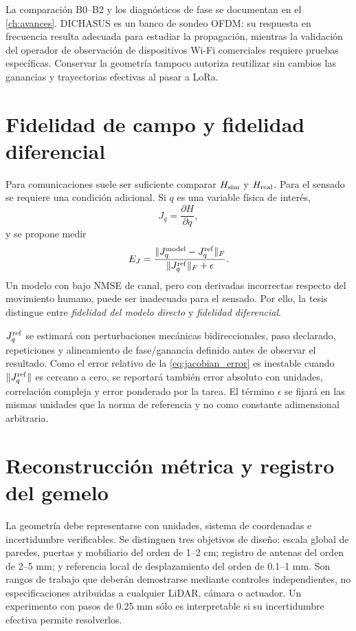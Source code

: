 La comparación B0--B2 y los diagnósticos de fase se documentan en el \cref{ch:avances}. DICHASUS es un banco de sondeo OFDM: su respuesta en frecuencia resulta adecuada para estudiar la propagación, mientras la validación del operador de observación de dispositivos Wi-Fi comerciales requiere pruebas específicas. Conservar la geometría tampoco autoriza reutilizar sin cambios las ganancias y trayectorias efectivas al pasar a LoRa.

\section{Fidelidad de campo y fidelidad diferencial}

Para comunicaciones suele ser suficiente comparar $H_{\rm sim}$ y $H_{\rm real}$. Para el sensado se requiere una condición adicional. Si $q$ es una variable física de interés,
\begin{equation}
J_q=\frac{\partial H}{\partial q},
\end{equation}
y se propone medir
\begin{equation}
E_J=
\frac{\|J_q^{\rm model}-J_q^{\rm ref}\|_F}
{\|J_q^{\rm ref}\|_F+\epsilon}.
\label{eq:jacobian_error}
\end{equation}
Un modelo con bajo \ac{NMSE} de canal, pero con derivadas incorrectas respecto del movimiento humano, puede ser inadecuado para el sensado. Por ello, la tesis distingue entre \emph{fidelidad del modelo directo} y \emph{fidelidad diferencial}.

$J_q^{\rm ref}$ se estimará con perturbaciones mecánicas bidireccionales, paso declarado, repeticiones y alineamiento de fase/ganancia definido antes de observar el resultado. Como el error relativo de la \cref{eq:jacobian_error} es inestable cuando $\|J_q^{\rm ref}\|$ es cercano a cero, se reportará también error absoluto con unidades, correlación compleja y error ponderado por la tarea. El término $\epsilon$ se fijará en las mismas unidades que la norma de referencia y no como constante adimensional arbitraria.

\section{Reconstrucción métrica y registro del gemelo}
\label{sec:geometric_metrology}

La geometría debe representarse con unidades, sistema de coordenadas e incertidumbre
verificables. Se distinguen tres objetivos de diseño: escala global de paredes,
puertas y mobiliario del orden de 1--2 cm; registro de antenas del orden de 2--5 mm;
y referencia local de desplazamiento del orden de 0.1--1 mm. Son rangos de trabajo
que deberán demostrarse mediante controles independientes, no especificaciones
atribuidas a cualquier LiDAR, cámara o actuador. Un experimento con pasos de
0.25 mm sólo es interpretable si su incertidumbre efectiva permite resolverlos.

